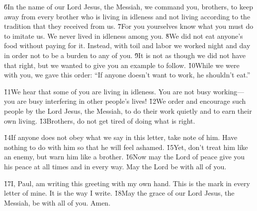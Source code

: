 \v{6}In the name of our Lord Jesus, the Messiah, we command you, brothers, to keep away from every brother who is living in idleness and not living according to the tradition that they received from us. \v{7}For you yourselves know what you must do to imitate us. We never lived in idleness among you. \v{8}We did not eat anyone's food without paying for it. Instead, with toil and labor we worked night and day in order not to be a burden to any of you. \v{9}It is not as though we did not have that right, but we wanted to give you an example to follow. \v{10}While we were with you, we gave this order: ``If anyone doesn't want to work, he shouldn't eat.''

\v{11}We hear that some of you are living in idleness. You are not busy working---you are busy interfering in other people's lives! \v{12}We order and encourage such people by the Lord Jesus, the Messiah, to do their work quietly and to earn their own living. \v{13}Brothers, do not get tired of doing what is right.

\v{14}If anyone does not obey what we say in this letter, take note of him. Have nothing to do with him so that he will feel ashamed. \v{15}Yet, don't treat him like an enemy, but warn him like a brother. \v{16}Now may the Lord of peace give you his peace at all times and in every way. May the Lord be with all of you.

\v{17}I, Paul, am writing this greeting with my own hand. This is the mark in every letter of mine. It is the way I write. \v{18}May the grace of our Lord Jesus, the Messiah, be with all of you. Amen.
